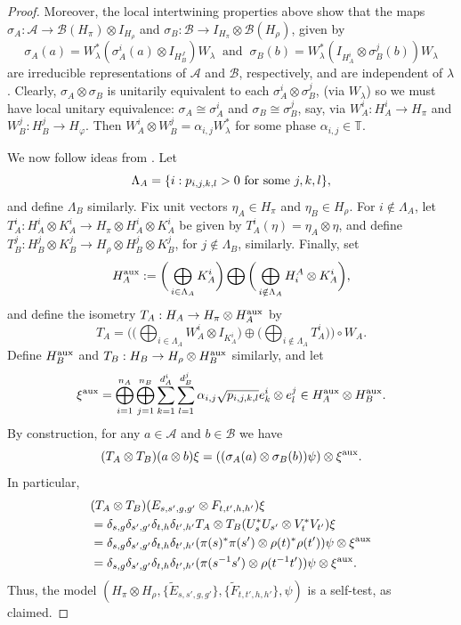 \documentclass[11pt]{amsart}
\theoremstyle{definition}
\newcommand{\cl}[1]{\mathcal{#1}}
\newcommand{\ten}{\otimes}
\newcommand{\vphi}{\varphi}
\begin{document}
\begin{proof}
Moreover, the local intertwining properties above show that 
the maps $\sigma_A : \cl A \to \cl{B}(H_\pi)\ten I_{H_\rho}$
and $\sigma_B : \cl B \to I_{H_\pi}\ten\cl{B}(H_\rho)$, given by 
$$\sigma_A(a) = W_\lambda^*(\sigma_A^i(a)\ten I_{H_B^J})W_\lambda
\ \mbox{ and } \ 
\sigma_B(b) = W_\lambda^*(I_{H_A^i}\ten\sigma_B^j(b))W_\lambda$$
are irreducible representations of $\cl A$ and $\cl B$, respectively, and are independent of $\lambda$. Clearly, $\sigma_A\ten\sigma_B$ is unitarily equivalent to each $\sigma_A^i\ten \sigma_B^j$, (via $W_\lambda$) so we must have local unitary equivalence: $\sigma_A\cong \sigma_A^i$ and $\sigma_B\cong\sigma_B^j$, say, via $W_A^i:H_A^i\to H_\pi$ and $W_B^j:H_B^j\to H_\vphi$. Then $W_A^i\ten W_B^j=\alpha_{i,j}W_\lambda^*$ for some phase $\alpha_{i,j}\in\mathbb{T}$.  

We now follow ideas from \cite[Theorem 4.12]{pszz}. Let 
$$\Lambda_A=\{i : p_{i,j,k,l}>0 \ \textnormal{for some} \ j,k,l\},$$ 
and define $\Lambda_B$ similarly. Fix unit vectors $\eta_A\in H_\pi$ and $\eta_B\in H_\rho$. For $i\notin\Lambda_A$, let 
$T_A^i:H_A^i\ten K_A^i \to H_\pi\ten H_A^i\ten K_A^i$ be given by
$T_A^i(\eta) = \eta_A\ten\eta$, and define 
$T_B^j:H_B^j\ten K_B^j\to H_\rho\ten H_B^j\ten K_B^j$, for $j\notin\Lambda_B$, similarly. Finally, set
$$H_A^{\rm aux}:=\bigg(\bigoplus_{i\in\Lambda_A}K_A^i\bigg)\bigoplus\bigg(\bigoplus_{i\notin\Lambda_A} H_i^A\ten K_A^i\bigg),$$
and define the isometry $T_A:H_A\to H_\pi\ten H_A^{\rm aux}$ by
$$T_A=\bigg(\bigg(\bigoplus_{i\in\Lambda_A}W_A^i\ten I_{K_A^i}\bigg)\oplus\bigg(\bigoplus_{i\notin\Lambda_A}T_A^i\bigg)\bigg)\circ W_A.$$
Define $H_B^{\rm aux}$ and $T_B:H_B\to H_\rho\ten H_B^{\rm aux}$ similarly, 
and let 
$$\xi^{\rm aux} = 
\bigoplus_{i=1}^{n_A} \bigoplus_{j=1}^{n_B}
\sum_{k=1}^{d_A^i} \sum_{l=1}^{d_B^j}
\alpha_{i,j} \sqrt{p_{i,j,k,l}}e_{k}^i\ten e_l^j\in H_A^{\rm aux}\ten H_B^{\rm aux}.$$ 
By construction, for any $a\in\cl A$ and $b\in\cl B$ we have
$$(T_A\ten T_B)(a\ten b)\xi=((\sigma_A(a)\ten \sigma_B(b))\psi)\ten\xi^{\rm aux}.$$
In particular,
\begin{align*}
& (T_A\ten T_B)(E_{s,s',g,g'}\ten F_{t,t',h,h'})\xi\\
& =\delta_{s,g}\delta_{s',g'}\delta_{t,h}\delta_{t',h'}T_A\ten T_B(U_s^*U_{s'}\ten V_t^*V_{t'})\xi\\
& =\delta_{s,g}\delta_{s',g'}\delta_{t,h}\delta_{t',h'}(\pi(s)^*\pi(s')\ten \rho(t)^*\rho(t'))\psi\ten\xi^{\rm aux}\\
& =\delta_{s,g}\delta_{s',g'}\delta_{t,h}\delta_{t',h'}(\pi(s^{-1}s')\ten \rho(t^{-1}t'))\psi\ten\xi^{\rm aux}.
\end{align*}
Thus, the model $(H_\pi\ten H_\rho, \{\widetilde{E}_{s,s',g,g'}\},\{\widetilde{F}_{t,t',h,h'}\},\psi)$ is a self-test, as claimed.
\end{proof}
\end{document}
